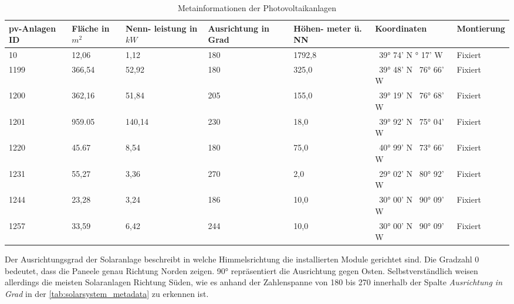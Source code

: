 \documentclass[12pt, a4paper]{article}
\begin{document}
\begin{table}
\begin{center}
\begin{tabular}{| p{1.5cm} | p{1.5cm} | p{1.5cm} | p{2.3cm}  | p{2cm} | p{2.2cm} | p{2cm} |}
\hline
\ac{pv}-Anlagen ID & Fläche in $m^2$ & Nenn- leistung in $kW$ & Ausrichtung in Grad & Höhen- meter ü. NN & Koordinaten & Montierung \\ \hline
  10 &  12,06 &   1,12 & 180 & 1792,8 & \ 39° 74' N \newline   105° 17' W & Fixiert \\ \hline
1199 & 366,54 &  52,92 & 180 &  325,0 & \ 39° 48' N \newline \  76° 66' W & Fixiert \\ \hline
1200 & 362,16 &  51,84 & 205 &  155,0 & \ 39° 19' N \newline \  76° 68' W & Fixiert \\ \hline
1201 & 959.05 & 140,14 & 230 &   18,0 & \ 39° 92' N \newline \  75° 04' W & Fixiert \\ \hline
1220 &  45.67 &   8,54 & 180 &   75,0 & \ 40° 99' N \newline \  73° 66' W & Fixiert \\ \hline
1231 &  55,27 &   3,36 & 270 &    2,0 & \ 29° 02' N \newline \  80° 92' W & Fixiert \\ \hline
1244 &  23,28 &   3,24 & 186 &   10,0 & \ 30° 00' N \newline \  90° 09' W & Fixiert \\ \hline
1257 &  33,59 &   6,42 & 244 &   10,0 & \ 30° 00' N \newline \  90° 09' W & Fixiert \\ \hline

\end{tabular}
\end{center}
\caption{Metainformationen der Photovoltaikanlagen}
\label{tab:solarsystem_metadata} 
\end{table}

Der Ausrichtungsgrad der Solaranlage beschreibt in welche Himmelsrichtung die installierten Module gerichtet sind. Die Gradzahl 0 bedeutet, dass die Paneele genau Richtung Norden zeigen. 90° repräsentiert die Ausrichtung gegen Osten. Selbstverständlich weisen allerdings die meisten Solaranlagen Richtung Süden, wie es anhand der Zahlenspanne von 180 bis 270 innerhalb der Spalte \textit{Ausrichtung in Grad} in der \autoref{tab:solarsystem_metadata} zu erkennen ist.
\end{document}
